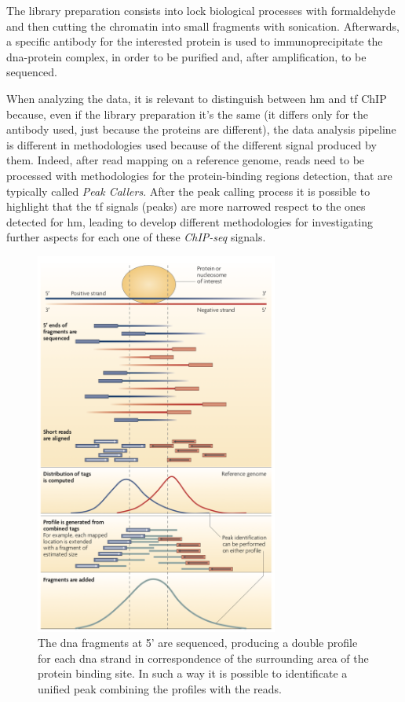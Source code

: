 The library preparation consists into lock biological processes with formaldehyde and then cutting the chromatin into small fragments with sonication.
Afterwards, a specific antibody for the interested protein is used to immunoprecipitate the \gls{dna}-protein complex, in order to be purified and, after amplification, to be sequenced.

When analyzing the data, it is relevant to distinguish between \gls{hm} and \gls{tf} ChIP because, even if the library preparation it's the same (it differs only for the antibody used, just because the proteins are different), the data analysis pipeline is different in methodologies used because of the different signal produced by them.
Indeed, after read mapping on a reference genome, reads need to be processed with methodologies for the protein-binding regions detection, that are typically called \textit{Peak Callers}.
After the peak calling process it is possible to highlight that the \gls{tf} signals (peaks) are more narrowed respect to the ones detected for \gls{hm}, leading to develop different methodologies for investigating further aspects for each one of these \textit{ChIP-seq} signals.

\begin{figure}[H]
\centering
\includegraphics[width=8cm, keepaspectratio]{img/intro/peak_call.png}
\caption[ChIP-seq peak detection]{The \gls{dna} fragments at 5' are sequenced, producing a double profile for each \gls{dna} strand in correspondence of the surrounding area of the protein binding site.
In such a way it is possible to identificate a unified peak combining the profiles with the reads.\cite{Park2009}}
\label{fig:chipseqexp}
\end{figure}

